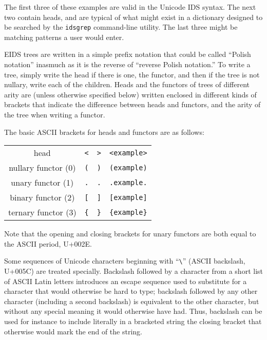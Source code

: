 \documentclass[twocolumn]{report}
\begin{document}
The first three of these examples are valid in the Unicode IDS syntax.  The
next two contain heads, and are typical of what might exist in a dictionary
designed to be searched by the \texttt{idsgrep} command-line utility.  The
last three might be matching patterns a user would enter.

EIDS trees are written in a simple prefix notation that could be called
``Polish notation'' inasmuch as it is the reverse of ``reverse Polish
notation.'' To write a tree, simply write the head if there is one, the
functor, and then if the tree is not nullary, write each of the children. 
Heads and the functors of trees of different arity are (unless otherwise
specified below) written enclosed in different kinds of brackets that
indicate the difference between heads and functors, and the arity of the
tree when writing a functor.

The basic ASCII brackets for heads and functors are as follows:

\hspace*{\fill}
\begin{tabular}{cccc}
  head & \texttt{<} & \texttt{>} & \texttt{<example>} \\
  nullary functor (0) & \texttt{(} & \texttt{)} & \texttt{(example)} \\
  unary functor (1) & \texttt{.} & \texttt{.} & \texttt{.example.} \\
  binary functor (2) & \texttt{[} & \texttt{]} & \texttt{[example]} \\
  ternary functor (3) & \texttt{\{} & \texttt{\}} & \texttt{\{example\}}
\end{tabular}
\hspace*{\fill}\par

Note that the opening and closing brackets for unary functors are both equal
to the ASCII period, U+002E.

Some sequences of Unicode characters beginning with
``\texttt{\textbackslash}'' (ASCII backslash, U+005C) are treated specially. 
Backslash followed by a character from a short list of ASCII Latin letters
introduces an escape sequence used to substitute for a character that would
otherwise be hard to type; backslash followed by any other character
(including a second backslash) is equivalent to the other character, but
without any special meaning it would otherwise have had.  Thus, backslash
can be used for instance to include literally in a bracketed string the
closing bracket that otherwise would mark the end of the string.
\end{document}
